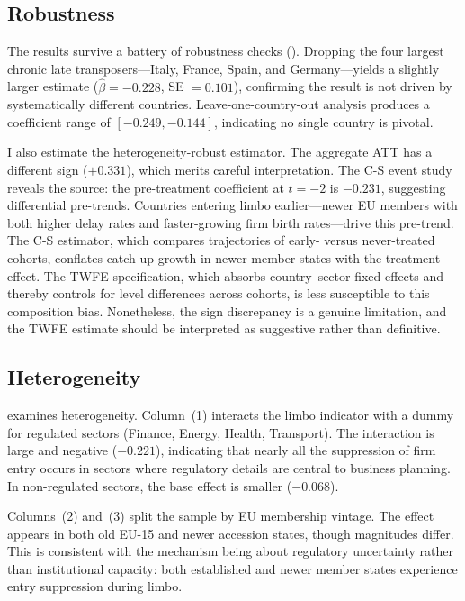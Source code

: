 \documentclass[12pt]{article}
\begin{document}


\subsection{Robustness}

The results survive a battery of robustness checks (). Dropping the four largest chronic late transposers---Italy, France, Spain, and Germany---yields a slightly larger estimate ($\hat{\beta} = -0.228$, SE $= 0.101$), confirming the result is not driven by systematically different countries. Leave-one-country-out analysis produces a coefficient range of $[-0.249, -0.144]$, indicating no single country is pivotal.

I also estimate the \citet{callaway2021} heterogeneity-robust estimator. The aggregate ATT has a different sign ($+0.331$), which merits careful interpretation. The C-S event study reveals the source: the pre-treatment coefficient at $t = -2$ is $-0.231$, suggesting differential pre-trends. Countries entering limbo earlier---newer EU members with both higher delay rates and faster-growing firm birth rates---drive this pre-trend. The C-S estimator, which compares trajectories of early- versus never-treated cohorts, conflates catch-up growth in newer member states with the treatment effect. The TWFE specification, which absorbs country--sector fixed effects and thereby controls for level differences across cohorts, is less susceptible to this composition bias. Nonetheless, the sign discrepancy is a genuine limitation, and the TWFE estimate should be interpreted as suggestive rather than definitive.



\subsection{Heterogeneity}

 examines heterogeneity. Column~(1) interacts the limbo indicator with a dummy for regulated sectors (Finance, Energy, Health, Transport). The interaction is large and negative ($-0.221$), indicating that nearly all the suppression of firm entry occurs in sectors where regulatory details are central to business planning. In non-regulated sectors, the base effect is smaller ($-0.068$).

Columns~(2) and~(3) split the sample by EU membership vintage. The effect appears in both old EU-15 and newer accession states, though magnitudes differ. This is consistent with the mechanism being about regulatory uncertainty rather than institutional capacity: both established and newer member states experience entry suppression during limbo.
\end{document}
